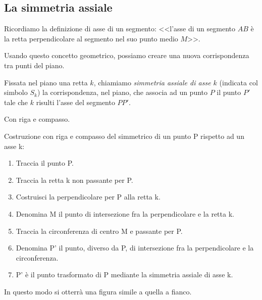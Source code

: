 \subsection{La simmetria assiale}

\noindent\begin{minipage}{0.65\textwidth}\parindent15pt

Ricordiamo la definizione di asse di un 
segmento: 
<<l'asse di un segmento \(AB\) è la retta perpendicolare al 
segmento nel suo punto medio \(M\)>>.

Usando questo concetto geometrico, possiamo creare una nuova 
corrispondenza tra punti del piano.
\end{minipage}\hfill
\begin{minipage}{0.25\textwidth}
  \centering 
\end{minipage}
\begin{definizione}
Fissata nel piano una retta \(k\), chiamiamo \emph{simmetria assiale di 
asse \(k\)} (indicata col simbolo \(S_k\)) la corrispondenza, nel piano, 
che associa ad un punto \(P\) il punto \(P'\) tale che \(k\) risulti l'asse 
del segmento \(PP'\).
\end{definizione}

Con riga e compasso.

\begin{procedura}
  Costruzione con riga e compasso del simmetrico di un punto P rispetto ad un 
asse k:
  \begin{enumerate} [nosep]
    \item 
    Traccia il punto P.
    \item 
    Traccia la retta k non passante per P.
    \item 
    Costruisci la perpendicolare per P alla retta k.
    \item 
    Denomina M il punto di intersezione fra la perpendicolare e la retta k.
    \item 
    Traccia la circonferenza di centro M e passante per P.
    \item 
    Denomina P' il punto, diverso da P, di intersezione fra la perpendicolare e 
la circonferenza. 
    \item 
    P' è il punto trasformato di P mediante la simmetria assiale di asse k.
  \end{enumerate}
\end{procedura}
In questo modo si otterrà una figura simile a quella a fianco.

